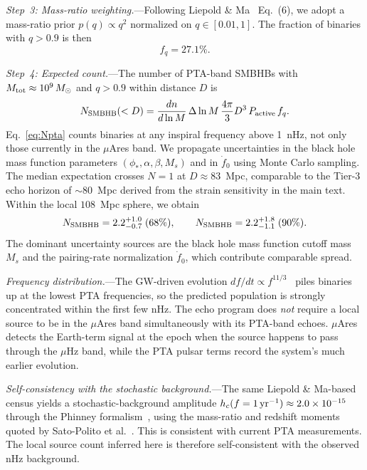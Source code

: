 \documentclass[aps,prx,twocolumn,superscriptaddress,nofootinbib,longbibliography]{revtex4-2}
\begin{document}
\textit{Step~3: Mass-ratio weighting.}---Following Liepold \& Ma~\cite{LiepoldMa2024} Eq.~(6), we adopt a mass-ratio prior $p(q)\propto q^2$ normalized on $q\in[0.01,1]$. The fraction of binaries with $q>0.9$ is then
\[
f_q = 27.1\% .
\]

\textit{Step~4: Expected count.}---The number of PTA-band SMBHBs with $M_{\rm tot}\approx10^9\,M_\odot$ and $q>0.9$ within distance $D$ is
\begin{equation}\label{eq:Npta}
N_{\rm SMBHB}(<D)
=
\frac{dn}{d\ln M}\,
\Delta\ln M\,
\frac{4\pi}{3}D^3\,
P_{\rm active}\,
f_q.
\end{equation}
Eq.~\eqref{eq:Npta} counts binaries at any inspiral frequency above 1~nHz, not only those currently in the $\mu$Ares band. We propagate uncertainties in the black hole mass function parameters $(\phi_*,\alpha,\beta,M_s)$ and in $\dot f_0$ using Monte Carlo sampling. The median expectation crosses $N=1$ at $D\approx83$~Mpc, comparable to the Tier-3 echo horizon of $\sim80$~Mpc derived from the strain sensitivity in the main text. Within the local $108$~Mpc sphere, we obtain
\[
N_{\rm SMBHB} = 2.2^{+1.0}_{-0.7}\;(68\%) ,
\qquad
N_{\rm SMBHB} = 2.2^{+1.8}_{-1.1}\;(90\%).
\]
The dominant uncertainty sources are the black hole mass function cutoff mass $M_s$ and the pairing-rate normalization $\dot f_0$, which contribute comparable spread.

\textit{Frequency distribution.}---The GW-driven evolution $df/dt\propto f^{11/3}$~\cite{Peters1964} piles binaries up at the lowest PTA frequencies, so the predicted population is strongly concentrated within the first few nHz. The echo program does \emph{not} require a local source to be in the $\mu$Ares band simultaneously with its PTA-band echoes. $\mu$Ares detects the Earth-term signal at the epoch when the source happens to pass through the $\mu$Hz band, while the PTA pulsar terms record the system's much earlier evolution.

\textit{Self-consistency with the stochastic background.}---The same Liepold \& Ma-based census yields a stochastic-background amplitude $h_c(f=1\,{\rm yr}^{-1})\approx2.0\times10^{-15}$ through the Phinney formalism~\cite{Phinney2001}, using the mass-ratio and redshift moments quoted by Sato-Polito et al.~\cite{SatoPolito2024}. This is consistent with current PTA measurements. The local source count inferred here is therefore self-consistent with the observed nHz background.



\end{document}
